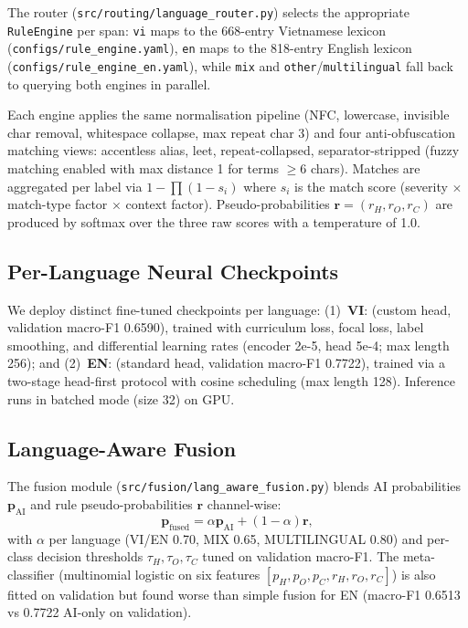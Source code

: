 The router (\texttt{src/routing/language\_router.py}) selects the appropriate \texttt{RuleEngine} per span: \texttt{vi} maps to the 668-entry Vietnamese lexicon (\texttt{configs/rule\_engine.yaml}), \texttt{en} maps to the 818-entry English lexicon (\texttt{configs/rule\_engine\_en.yaml}), while \texttt{mix} and \texttt{other}/\texttt{multilingual} fall back to querying both engines in parallel.

Each engine applies the same normalisation pipeline (NFC, lowercase, invisible
char removal, whitespace collapse, max repeat char 3) and four
anti-obfuscation matching views: accentless alias, leet, repeat-collapsed,
separator-stripped (fuzzy matching enabled with max distance 1 for terms
$\ge$6 chars).  Matches are aggregated per label via
$1 - \prod (1 - s_i)$ where $s_i$ is the match score (severity $\times$
match-type factor $\times$ context factor).  Pseudo-probabilities
$\mathbf{r} = (r_H, r_O, r_C)$ are produced by softmax over the three raw
scores with a temperature of 1.0.

\subsection{Per-Language Neural Checkpoints}
\label{sec:checkpoints}

We deploy distinct fine-tuned checkpoints per language:
(1)~\textbf{VI}:  (custom head, validation macro-F1 0.6590), trained with curriculum loss, focal loss, label smoothing, and differential learning rates (encoder 2e-5, head 5e-4; max length 256); and
(2)~\textbf{EN}:  (standard head, validation macro-F1 0.7722), trained via a two-stage head-first protocol with cosine scheduling (max length 128). Inference runs in batched mode (size 32) on GPU.

\subsection{Language-Aware Fusion}
\label{sec:fusion}

The fusion module (\texttt{src/fusion/lang\_aware\_fusion.py}) blends AI
probabilities $\mathbf{p}_{\text{AI}}$ and rule pseudo-probabilities
$\mathbf{r}$ channel-wise:
\begin{equation}
    \mathbf{p}_{\text{fused}} = \alpha \mathbf{p}_{\text{AI}} + (1-\alpha)
    \mathbf{r},
\end{equation}
with $\alpha$ per language (VI/EN 0.70, MIX 0.65, MULTILINGUAL 0.80) and
per-class decision thresholds $\tau_H, \tau_O, \tau_C$ tuned on validation
macro-F1.  The meta-classifier (multinomial logistic on six features
$[p_H,p_O,p_C,r_H,r_O,r_C]$) is also fitted on validation but found worse than
simple fusion for EN (macro-F1 0.6513 vs 0.7722 AI-only on validation).